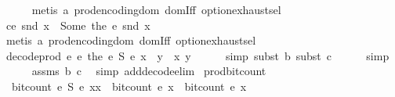 \begin{isabellebody}
\ \ \ \ \isamarkupfalse%
\ {\isacharparenleft}{\kern0pt}metis\ a\ prod{\isacharunderscore}{\kern0pt}encoding{\isacharunderscore}{\kern0pt}dom\ domIff\ option{\isachardot}{\kern0pt}exhaust{\isacharunderscore}{\kern0pt}sel{\isacharparenright}{\kern0pt}\isanewline
\ \ \isamarkupfalse%
\ c{\isacharcolon}{\kern0pt}{\isachardoublequoteopen}e{}\ {\isacharparenleft}{\kern0pt}snd\ x{\isacharparenright}{\kern0pt}\ {\isacharequal}{\kern0pt}\ Some\ {\isacharparenleft}{\kern0pt}the\ {\isacharparenleft}{\kern0pt}e{}\ {\isacharparenleft}{\kern0pt}snd\ x{\isacharparenright}{\kern0pt}{\isacharparenright}{\kern0pt}{\isacharparenright}{\kern0pt}{\isachardoublequoteclose}\ \isanewline
\ \ \ \ \isamarkupfalse%
\ {\isacharparenleft}{\kern0pt}metis\ a\ prod{\isacharunderscore}{\kern0pt}encoding{\isacharunderscore}{\kern0pt}dom\ domIff\ option{\isachardot}{\kern0pt}exhaust{\isacharunderscore}{\kern0pt}sel{\isacharparenright}{\kern0pt}\isanewline
\isanewline
\ \ \isamarkupfalse%
\ {\isachardoublequoteopen}decode{\isacharunderscore}{\kern0pt}prod\ e{}\ e{}\ {\isacharparenleft}{\kern0pt}the\ {\isacharparenleft}{\kern0pt}{\isacharparenleft}{\kern0pt}e{}\ {\isasymtimes}\isactrlsub S\ e{}{\isacharparenright}{\kern0pt}\ x{\isacharparenright}{\kern0pt}\ {\isacharat}{\kern0pt}\ y{\isacharparenright}{\kern0pt}\ {\isacharequal}{\kern0pt}\ {\isacharparenleft}{\kern0pt}x{\isacharcomma}{\kern0pt}\ y{\isacharparenright}{\kern0pt}{\isachardoublequoteclose}\isanewline
\ \ \ \ \isamarkupfalse%
\ {\isacharparenleft}{\kern0pt}simp{\isacharcomma}{\kern0pt}\ subst\ b{\isacharcomma}{\kern0pt}\ subst\ c{\isacharparenright}{\kern0pt}\isanewline
\ \ \ \ \isamarkupfalse%
\ simp\isanewline
\ \ \ \ \isamarkupfalse%
\ assms\ b\ c\ \isamarkupfalse%
\ {\isacharparenleft}{\kern0pt}simp\ add{\isacharcolon}{\kern0pt}decode{\isacharunderscore}{\kern0pt}elim{\isacharparenright}{\kern0pt}\isanewline
{}\isamarkupfalse%
%
\endisatagproof
{\isafoldproof}%
%
\isadelimproof
\isanewline
%
\endisadelimproof
\isanewline
{}\isamarkupfalse%
\ prod{\isacharunderscore}{\kern0pt}bit{\isacharunderscore}{\kern0pt}count{\isacharcolon}{\kern0pt}\isanewline
\ \ {\isachardoublequoteopen}bit{\isacharunderscore}{\kern0pt}count\ {\isacharparenleft}{\kern0pt}{\isacharparenleft}{\kern0pt}e\ {\isasymtimes}\isactrlsub S\ e\ {\isacharparenleft}{\kern0pt}xx\ {\isacharequal}{\kern0pt}\ bit{\isacharunderscore}{\kern0pt}count\ {\isacharparenleft}{\kern0pt}e\ x\ {\isacharplus}{\kern0pt}\ bit{\isacharunderscore}{\kern0pt}count\ {\isacharparenleft}{\kern0pt}e\ x\isanewline

\end{isabellebody}
